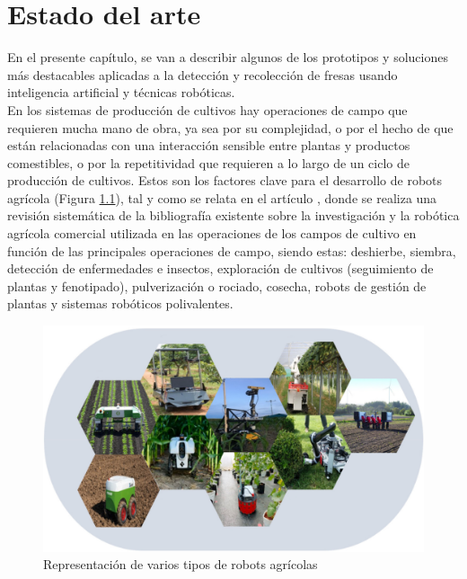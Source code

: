 \chapter{Estado del arte}
\label{cap:capitulo2}

\setcounter{footnote}{7} 
	
En el presente capítulo, se van a describir algunos de los prototipos y soluciones más destacables aplicadas a la detección y recolección de fresas usando inteligencia artificial y técnicas robóticas.\\

En los sistemas de producción de cultivos hay operaciones de campo que requieren mucha mano de obra, ya sea por su complejidad, o por el hecho de que están relacionadas con una interacción sensible entre plantas y productos comestibles, o por la repetitividad que requieren a lo largo de un ciclo de producción de cultivos. Estos son los factores clave para el desarrollo de robots agrícola (Figura \ref{fig:Robots_agricolas}), tal y como se relata en el artículo \cite{Fountas20}, donde se realiza una revisión sistemática de la bibliografía existente sobre la investigación y la robótica agrícola comercial utilizada en las operaciones de los campos de cultivo en función de las principales operaciones de campo, siendo estas: deshierbe, siembra, detección de enfermedades e insectos, exploración de cultivos (seguimiento de plantas y fenotipado), pulverización o rociado, cosecha, robots de gestión de plantas y sistemas robóticos polivalentes.

\begin{figure} [H]
    \begin{center}
      \includegraphics[width=12cm]{figs/Representación robots agrícolas.png}
    \end{center}
    \caption{Representación de varios tipos de robots agrícolas}
    \label{fig:Robots_agricolas}
\end{figure}

